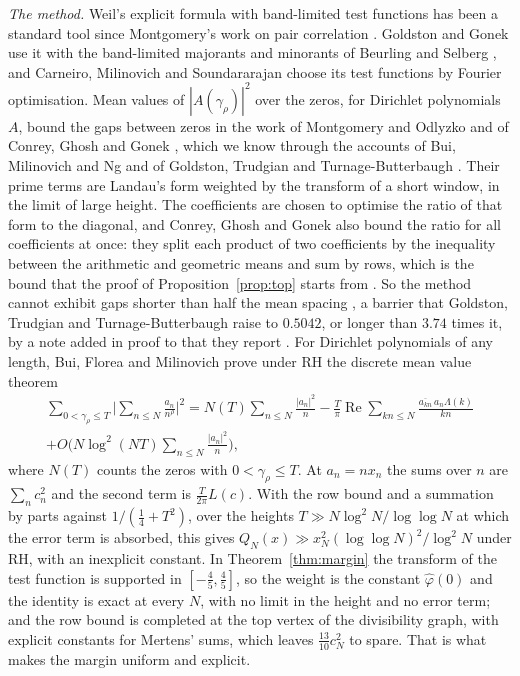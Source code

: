 \documentclass[11pt]{article}
\theoremstyle{definition}
\begin{document}
\emph{The method.} Weil's explicit formula with band-limited test functions has been a standard tool since
Montgomery's work on pair correlation \cite{montgomery73}. Goldston and Gonek \cite{goldston-gonek07} use it with the
band-limited majorants and minorants of Beurling and Selberg \cite{vaaler85}, and Carneiro, Milinovich and
Soundararajan \cite{cms19} choose its test functions by Fourier optimisation. Mean values of $|A(\gamma_\rho)|^2$ over
the zeros, for Dirichlet polynomials $A$, bound the gaps between zeros in the work of Montgomery and Odlyzko
\cite{montgomery-odlyzko} and of Conrey, Ghosh and Gonek \cite{cgg84}, which we know through the accounts of Bui,
Milinovich and Ng \cite{bmn10} and of Goldston, Trudgian and Turnage-Butterbaugh \cite{gtt23}. Their prime terms are
Landau's form weighted by the transform of a short window, in the limit of large height. The coefficients are chosen
to optimise the ratio of that form to the diagonal, and Conrey, Ghosh and Gonek also bound the ratio for all
coefficients at once: they split each product of two coefficients by the inequality between the arithmetic and
geometric means and sum by rows, which is the bound that the proof of Proposition~\ref{prop:top} starts from
\cite[Sections~2 and~3]{gtt23}. So the method cannot exhibit gaps shorter than half the mean spacing
\cite[Section~5]{bmn10}, a barrier that Goldston, Trudgian and Turnage-Butterbaugh raise to $0.5042$, or longer than
$3.74$ times it, by a note added in proof to \cite{cgg84} that they report \cite{gtt23}. For Dirichlet polynomials of
any length, Bui, Florea and Milinovich \cite[Theorem~3.1]{bfm24} prove under RH the discrete mean value theorem
\begin{multline*}
\sum_{0 < \gamma_\rho \le T} \Big|\sum_{n \le N} \frac{a_n}{n^\rho}\Big|^2 = N(T) \sum_{n \le N} \frac{|a_n|^2}{n} -
\frac T\pi \operatorname{Re} \sum_{kn \le N} \frac{\overline{a_{kn}}\,a_n \Lambda(k)}{kn} \\
+ O\Big(N \log^2(NT) \sum_{n \le N} \frac{|a_n|^2}{n}\Big),
\end{multline*}
where $N(T)$ counts the zeros with $0 < \gamma_\rho \le T$. At $a_n = n x_n$ the sums over $n$ are $\sum_n c_n^2$ and
the second term is $\frac{T}{2\pi} L(c)$. With the row bound and a summation by parts against $1/(\frac14 + T^2)$,
over the heights $T \gg N \log^2 N/\log\log N$ at which the error term is absorbed, this gives $Q_N(x) \gg x_N^2
(\log\log N)^2/\log^2 N$ under RH, with an inexplicit constant. In Theorem~\ref{thm:margin} the transform of the test
function is supported in $[-\frac45, \frac45]$, so the weight is the constant $\hat\varphi(0)$ and the identity is
exact at every $N$, with no limit in the height and no error term; and the row bound is completed at the top vertex
of the divisibility graph, with explicit constants for Mertens' sums, which leaves $\frac{13}{10} c_N^2$ to spare.
That is what makes the margin uniform and explicit.
\end{document}

